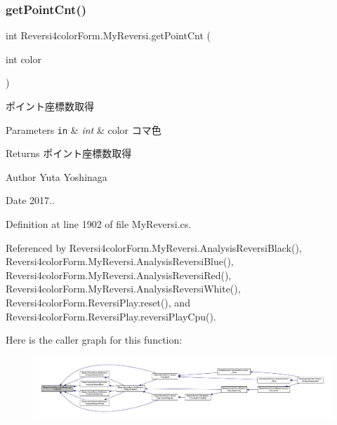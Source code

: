 \subsubsection{\texorpdfstring{get\+Point\+Cnt()}{getPointCnt()}}
{\footnotesize\ttfamily int Reversi4color\+Form.\+My\+Reversi.\+get\+Point\+Cnt (\begin{DoxyParamCaption}\item[{int}]{color }\end{DoxyParamCaption})}



ポイント座標数取得 


\begin{DoxyParams}[1]{Parameters}
\mbox{\tt in}  & {\em int} & color コマ色 \\
\hline
\end{DoxyParams}
\begin{DoxyReturn}{Returns}
ポイント座標数取得 
\end{DoxyReturn}
\begin{DoxyAuthor}{Author}
Yuta Yoshinaga 
\end{DoxyAuthor}
\begin{DoxyDate}{Date}
2017.. 
\end{DoxyDate}


Definition at line 1902 of file My\+Reversi.\+cs.



Referenced by Reversi4color\+Form.\+My\+Reversi.\+Analysis\+Reversi\+Black(), Reversi4color\+Form.\+My\+Reversi.\+Analysis\+Reversi\+Blue(), Reversi4color\+Form.\+My\+Reversi.\+Analysis\+Reversi\+Red(), Reversi4color\+Form.\+My\+Reversi.\+Analysis\+Reversi\+White(), Reversi4color\+Form.\+Reversi\+Play.\+reset(), and Reversi4color\+Form.\+Reversi\+Play.\+reversi\+Play\+Cpu().

Here is the caller graph for this function\+:
\nopagebreak
\begin{figure}[H]
\begin{center}
\leavevmode
\includegraphics[width=350pt]{class_reversi4color_form_1_1_my_reversi_a64db9e5d07901c13e985e1730816bb25_icgraph}
\end{center}
\end{figure}
\mbox{\label{class_reversi4color_form_1_1_my_reversi_afdfd5f0fc3a4ed4e24bcf67ead0bb980}} 
